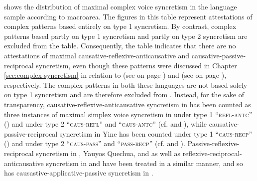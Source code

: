  shows the distribution of maximal complex voice syncretism in the language sample according to macroarea. The figures in this table represent attestations of complex patterns based entirely on type 1 syncretism. By contrast, complex patterns based partly on type 1 syncretism and partly on type 2 syncretism are excluded from the table. Consequently, the table indicates that there are no attestations of maximal causative-reflexive-anticausative and causative-passive-reciprocal syncretism, even though these patterns were discussed in Chapter \ref{sec:complex-syncretism} in relation to  (see  on page \pageref{tab:ch5:caus-refl-antc}) and  (see  on page \pageref{tab:ch5:caus-recp-pass}), respectively. The complex patterns in both these languages are not based solely on type 1 syncretism and are therefore excluded from . Instead, for the sake of transparency, causative-reflexive-anticausative syncretism in  has been counted as three instances of maximal simplex voice syncretism in  under type 1 “\textsc{refl-antc}” () and under type 2 “\textsc{caus-refl}” and “\textsc{caus-antc}” (cf.  and ), while causative-passive-reciprocal syncretism in Yine has been counted under type 1 “\textsc{caus-recp}” () and under type 2 “\textsc{caus-pass}” and “\textsc{pass-recp}” (cf.  and ). Passive-reflexive-reciprocal syncretism in , Yauyos Quechua, and  as well as reflexive-reciprocal-anticausative syncretism in  and  have been treated in a similar manner, and so has causastive-applicative-passive syncretism in .

